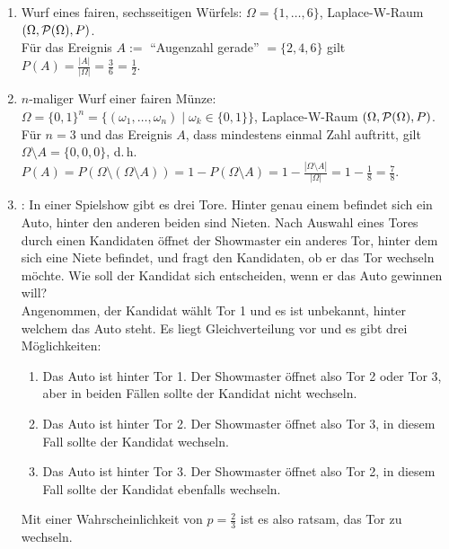 \begin{Bsp}
    \begin{enumerate}
        \item
        Wurf eines fairen, sechsseitigen Würfels:
        $\Omega = \{1, \dotsc, 6\}$, Laplace-W-Raum $(\Omega, \P(\Omega), P)$.\\
        Für das Ereignis $A :=$ "`Augenzahl gerade"' $= \{2, 4, 6\}$ gilt
        $P(A) = \frac{|A|}{|\Omega|} = \frac{3}{6} = \frac{1}{2}$.

        \item
        $n$-maliger Wurf einer fairen Münze:\\
        $\Omega = \{0, 1\}^n = \{(\omega_1, \dotsc, \omega_n) \;|\; \omega_k \in \{0, 1\}\}$,
        Laplace-W-Raum $(\Omega, \P(\Omega), P)$.\\
        Für $n = 3$ und das Ereignis $A$, dass mindestens einmal Zahl auftritt, gilt
        $\Omega \setminus A = \{0, 0, 0\}$, d.\,h.
        $P(A) = P(\Omega \setminus (\Omega \setminus A)) = 1 - P(\Omega \setminus A) =
        1 - \frac{|\Omega \setminus A|}{|\Omega|} = 1 - \frac{1}{8} = \frac{7}{8}$.

        \item
        :
        In einer Spielshow gibt es drei Tore.
        Hinter genau einem befindet sich ein Auto, hinter den anderen beiden sind Nieten.
        Nach Auswahl eines Tores durch einen Kandidaten öffnet der Showmaster ein anderes Tor,
        hinter dem sich eine Niete befindet, und fragt den Kandidaten, ob er das Tor wechseln
        möchte.
        Wie soll der Kandidat sich entscheiden, wenn er das Auto gewinnen will?\\
        Angenommen, der Kandidat wählt Tor 1 und es ist unbekannt, hinter welchem das Auto steht.
        Es liegt Gleichverteilung vor und es gibt drei Möglichkeiten:
        \begin{enumerate}[label=\arabic*.]
            \item
            Das Auto ist hinter Tor 1.
            Der Showmaster öffnet also Tor 2 oder Tor 3, aber in beiden Fällen sollte der Kandidat
            nicht wechseln.

            \item
            Das Auto ist hinter Tor 2.
            Der Showmaster öffnet also Tor 3, in diesem Fall sollte der Kandidat wechseln.

            \item
            Das Auto ist hinter Tor 3.
            Der Showmaster öffnet also Tor 2,
            in diesem Fall sollte der Kandidat ebenfalls wechseln.
        \end{enumerate}
        Mit einer Wahrscheinlichkeit von $p = \frac{2}{3}$ ist es also ratsam, das Tor zu wechseln.
    \end{enumerate}
\end{Bsp}

